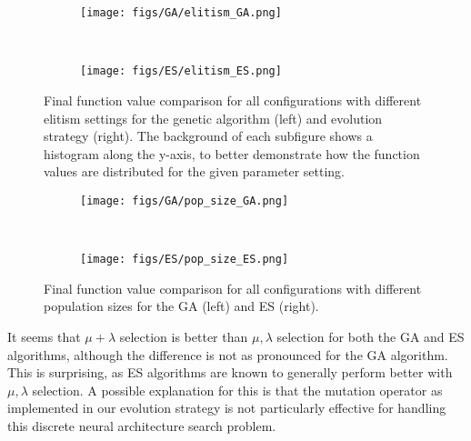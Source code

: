 \documentclass{article}
\begin{document}
\begin{figure*}[htbp]
    \centering
    \begin{subfigure}[b]{0.45\textwidth}
        \centering
        \texttt{[image: figs/GA/elitism\_GA.png]}
        \caption{}
        \label{fig:elitism_GA}
    \end{subfigure}
    ~
    \begin{subfigure}[b]{0.45\textwidth}
        \centering 
        \texttt{[image: figs/ES/elitism\_ES.png]}
        \caption{}
        \label{fig:elitism_ES}
    \end{subfigure}
    \captionsetup{width=.9\textwidth}
    \caption{
        Final function value comparison for all configurations with different elitism settings for the genetic algorithm (left) and evolution strategy (right).
        The background of each subfigure shows a histogram along the y-axis, to better demonstrate how the function values are distributed for the given parameter setting.
    }
    \label{fig:elitism}
\end{figure*}

\begin{figure*}[htbp]
    \centering
    \begin{subfigure}[b]{0.45\textwidth}
        \centering
        \texttt{[image: figs/GA/pop\_size\_GA.png]}
        \caption{}
        \label{fig:pop_size_GA}
    \end{subfigure}
    ~
    \begin{subfigure}[b]{0.45\textwidth}
        \centering 
        \texttt{[image: figs/ES/pop\_size\_ES.png]}
        \caption{}
        \label{fig:pop_size_ES}
    \end{subfigure}
    \captionsetup{width=.9\textwidth}
    \caption{
        Final function value comparison for all configurations with different population sizes for the GA (left) and ES (right).
    }
    \label{fig:pop_size}
\end{figure*}

It seems that $\mu + \lambda$ selection is better than $\mu, \lambda$ selection for both the GA and ES algorithms, although the difference is not as pronounced for the GA algorithm.
This is surprising, as ES algorithms are known to generally perform better with $\mu, \lambda$ selection.
A possible explanation for this is that the mutation operator as implemented in our evolution strategy is not particularly effective for handling this discrete neural architecture search problem.
\end{document}
